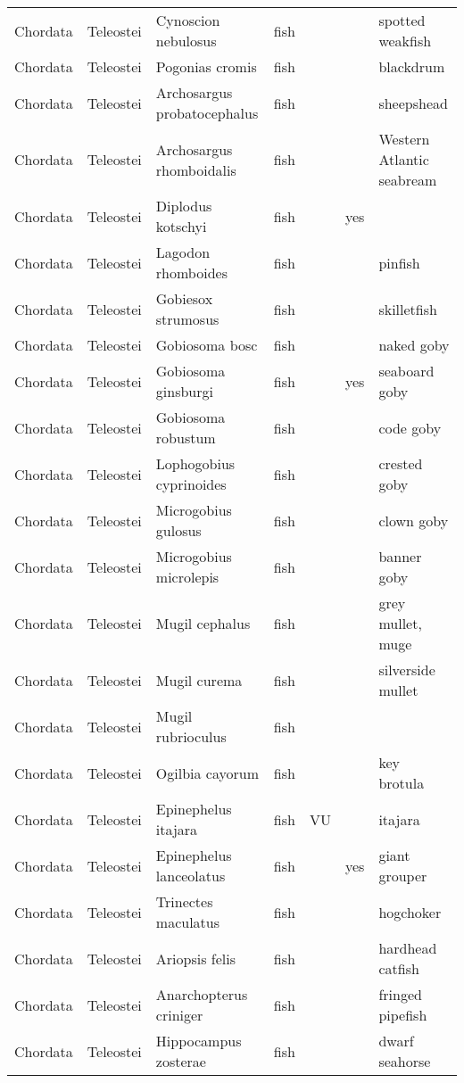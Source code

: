 \begin{longtable}{lllllll}
  Chordata & Teleostei & Cynoscion nebulosus & fish &  &  & spotted weakfish \\ 
  Chordata & Teleostei & Pogonias cromis & fish &  &  & blackdrum \\ 
  Chordata & Teleostei & Archosargus probatocephalus & fish &  &  & sheepshead \\ 
  Chordata & Teleostei & Archosargus rhomboidalis & fish &  &  & Western Atlantic seabream \\ 
  Chordata & Teleostei & Diplodus kotschyi & fish &  & yes &  \\ 
  Chordata & Teleostei & Lagodon rhomboides & fish &  &  & pinfish \\ 
  Chordata & Teleostei & Gobiesox strumosus & fish &  &  & skilletfish \\ 
  Chordata & Teleostei & Gobiosoma bosc & fish &  &  & naked goby \\ 
  Chordata & Teleostei & Gobiosoma ginsburgi & fish &  & yes & seaboard goby \\ 
  Chordata & Teleostei & Gobiosoma robustum & fish &  &  & code goby \\ 
  Chordata & Teleostei & Lophogobius cyprinoides & fish &  &  & crested goby \\ 
  Chordata & Teleostei & Microgobius gulosus & fish &  &  & clown goby \\ 
  Chordata & Teleostei & Microgobius microlepis & fish &  &  & banner goby \\ 
  Chordata & Teleostei & Mugil cephalus & fish &  &  & grey mullet, muge \\ 
  Chordata & Teleostei & Mugil curema & fish &  &  & silverside mullet \\ 
  Chordata & Teleostei & Mugil rubrioculus & fish &  &  &  \\ 
  Chordata & Teleostei & Ogilbia cayorum & fish &  &  & key brotula \\ 
  Chordata & Teleostei & Epinephelus itajara & fish & VU &  & itajara \\ 
  Chordata & Teleostei & Epinephelus lanceolatus & fish &  & yes & giant grouper \\ 
  Chordata & Teleostei & Trinectes maculatus & fish &  &  & hogchoker \\ 
  Chordata & Teleostei & Ariopsis felis & fish &  &  & hardhead catfish \\ 
  Chordata & Teleostei & Anarchopterus criniger & fish &  &  & fringed pipefish \\ 
  Chordata & Teleostei & Hippocampus zosterae & fish &  &  & dwarf seahorse \\ 

\end{longtable}
